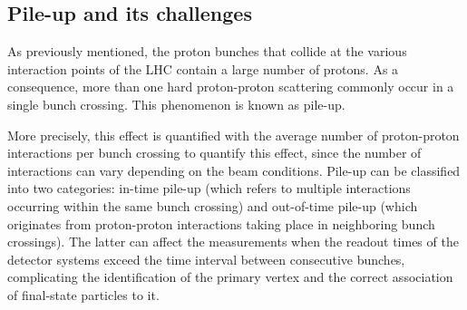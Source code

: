 \subsection{Pile-up and its challenges}

As previously mentioned, the proton bunches that collide at the various interaction points of the LHC contain a large number of protons. As a consequence, more than one hard proton-proton scattering commonly occur in a single bunch crossing. This phenomenon is known as pile-up.

More precisely, this effect is quantified with the average number of proton-proton interactions per bunch crossing to quantify this effect, since the number of interactions can vary depending on the beam conditions. Pile-up can be classified into two categories: in-time pile-up (which refers to multiple interactions occurring within the same bunch crossing) and out-of-time pile-up (which originates from proton-proton interactions taking place in neighboring bunch crossings). The latter can affect the measurements when the readout times of the detector systems exceed the time interval between consecutive bunches, complicating the identification of the primary vertex and the correct association of final-state particles to it.

